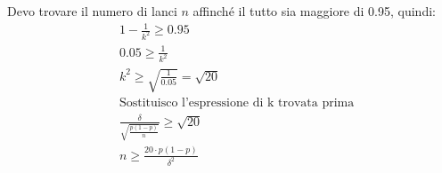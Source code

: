 \documentclass[12pt]{article}
\begin{document}
Devo trovare il numero di lanci \(n\) affinché il tutto sia maggiore di 0.95, quindi:
\begin{align*}
    &1-\frac{1}{k^2} \ge 0.95 \\
    &0.05 \ge \frac{1}{k^2} \\
    &k^2 \ge \sqrt{\frac{1}{0.05}} = \sqrt{20} \\
    &\text{Sostituisco l'espressione di k trovata prima} \\
    &\frac{\delta}{\sqrt{\frac{p(1-p)}{n}}} \ge \sqrt{20} \\
    &n\ge \frac{20\cdot p(1-p)}{\delta^2}
\end{align*}
\end{document}
